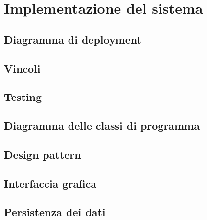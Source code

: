 \chapter{Implementazione del sistema}\label{implementazione}




\section{Diagramma di deployment}




\section{Vincoli}




\section{Testing}




\section{Diagramma delle classi di programma}




\section{Design pattern}




\section{Interfaccia grafica}




\section{Persistenza dei dati}
